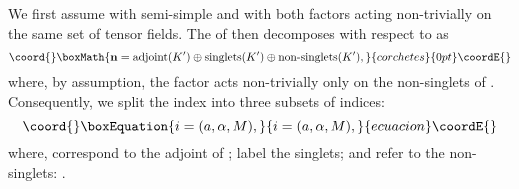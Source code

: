 \documentclass[a4paper,11pt]{article}
\begin{document}
We first assume \coordHE{} with \coordHE{} semi-simple and
with both factors acting non-trivially on the same set of tensor
fields. The \coordHE{} of \coordHE{} then decomposes with respect
to \coordHE{} as
\begin{displaymath}\coord{}\boxMath{
\mathbf{n}=\textrm{adjoint}(K')\oplus \textrm{singlets}(K')\oplus
\textrm{non-singlets}(K'),
}{corchetes}{0pt}\coordE{}\end{displaymath}
where, by assumption, the \coordHE{} factor acts non-trivially only on
the non-singlets of \coordHE{}. Consequently, we split the index
\coordHE{} into three subsets of indices:
\begin{equation}\coord{}\boxEquation{
i=(a,\alpha,M),
}{
i=(a,\alpha,M),
}{ecuacion}\coordE{}\end{equation}
where, \coordHE{} correspond to the
adjoint of \coordHE{}; \coordHE{} label the \coordHE{}
singlets; and \coordHE{} refer to the \coordHE{}
non-singlets: \coordHE{}.
\end{document}
